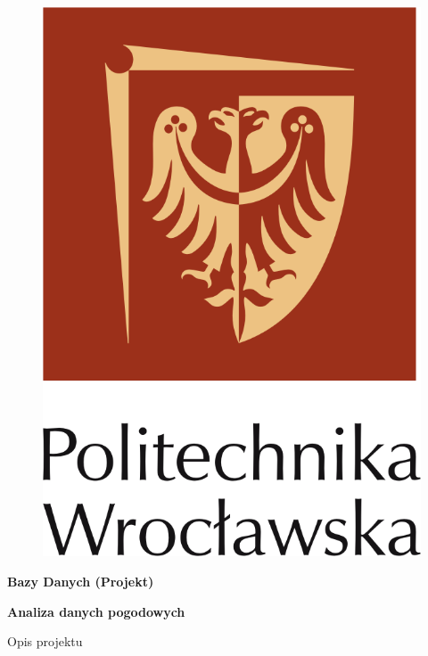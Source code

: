 \documentclass[12pt,a4paper]{article}
\begin{document}
\clearpage
\thispagestyle{empty}

\begin{figure}[H]
\centering
\includegraphics[scale=1.3]{logo.png}
\end{figure}

\vspace{16pt}

\begin{center}
\textbf{\huge Bazy Danych (Projekt)}

\vspace{30pt}

\textbf{\LARGE Analiza danych pogodowych}


\vspace{22pt}

\LARGE Opis projektu

\end{center}
\end{document}
